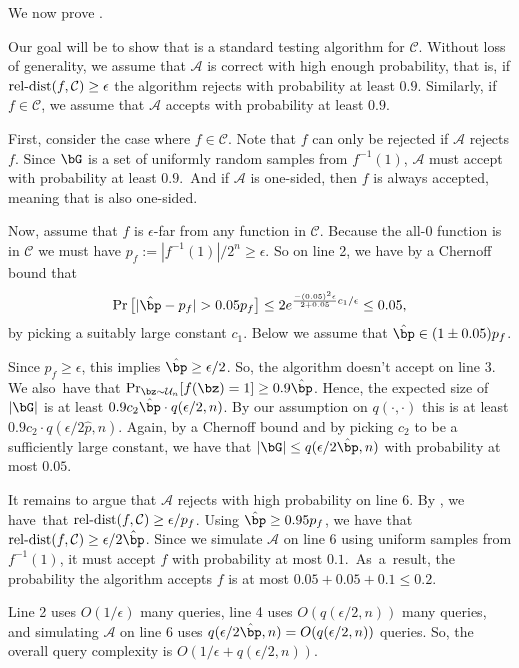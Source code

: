 \documentclass[11pt]{article}
\theoremstyle{definition}
\begin{document}
We now prove .
\begin{proofof}{}
    Our goal will be to show that  is a standard testing algorithm for $\mathcal{C}$. Without loss of generality, we assume that $\mathcal{A}$ is correct with high enough probability, that is, if $\mathrm{rel}\text{-}\mathrm{dist}(f,\mathcal{C}) \geq \epsilon$ the algorithm rejects with probability at least $0.9$. Similarly, if $f \in \mathcal{C}$, we assume that $\mathcal{A}$ accepts with probability at least $0.9$. 

    First, consider the case where $f \in \mathcal{C}$. Note that $f$ can only be rejected if $\mathcal{A}$ rejects $f$. Since $\bG$ is a set of uniformly random samples from $f^{-1}(1)$, $\mathcal{A}$ must accept with probability at least $0.9$.~And if $\mathcal{A}$ is one-sided, then $f$ is always accepted, meaning that    is also one-sided. 

    Now, assume that $f$ is $\epsilon$-far from any function in $\mathcal{C}$. Because the all-$0$ function is in $\mathcal{C}$ we must have $p_f:= {|f^{-1}(1)|}/{2^n}\geq \epsilon$. So on line 2, we have by a Chernoff bound that $$\Pr\big[|\hat{\bp}-p_f|>0.05p_f\big] \leq 2e^{\frac{-(0.05)^2 \epsilon}{2+0.05} c_1/\epsilon} \leq 0.05,$$ by picking a suitably large constant $c_1$. Below we assume that $\hat{\bp} \in (1 \pm 0.05)p_f$. 
    
    Since $p_f \geq \epsilon$, this implies $\hat{\bp} \geq \epsilon/2$. So, the algorithm doesn't accept on line $3$. We also~have that $\Pr_{\bz \sim \mathcal{U}_n}[f(\bz)=1]\geq 0.9 \hat{\bp}$. Hence, the expected size of  $|\bG|$ is at least $0.9c_2\hat{\bp} \cdot q(\epsilon/2,n)$. By our assumption on $q(\cdot ,\cdot)$ this is at least $0.9c_2\cdot q(\epsilon/2\hat{p}, n)$.
    Again, by a Chernoff bound and by picking
      $c_2$ to be a sufficiently large constant, we have that  $|\bG|\leq q(\epsilon/2 \hat{\bp},n)$ with probability at most $0.05$.


 It remains to argue that $\mathcal{A}$ rejects with high probability on line $6$. By , we have~that $\mathrm{rel}\text{-}\mathrm{dist}(f,\mathcal{C})\geq \epsilon/p_f$. Using $\hat{\bp} \geq 0.95p_f$, we have that $\reldist(f,\mathcal{C}) \geq \epsilon/2\hat{\bp}$. Since we simulate $\mathcal{A}$ on line $6$ using uniform samples from $f^{-1}(1)$, it must accept $f$ with probability at most $0.1$.~As~a~result, the probability the algorithm accepts $f$ is at most $0.05+0.05+0.1 \leq 0.2$.

     Line 2 uses $O(1/\epsilon)$ many queries, line 4 uses $O(q(\epsilon/2,n))$ many queries, and simulating $\mathcal{A}$ on line 6 uses $q(\epsilon/2\hat{\bp}, n) = O(q(\epsilon/2,n))$ queries. So, the overall query complexity  is $O(1/\epsilon+q(\epsilon/2,n))$.
\end{proofof}
\end{document}
